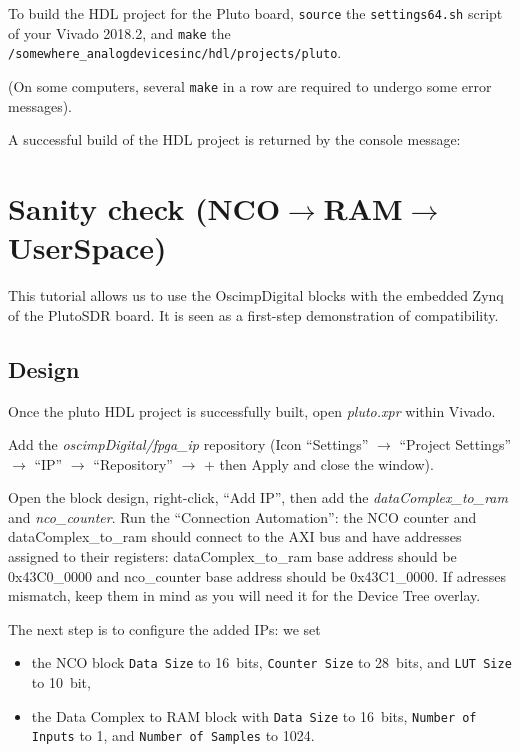 \documentclass{article}
\begin{document}
To build the HDL project for the Pluto board, {\tt source} the
{\tt settings64.sh} script of your Vivado 2018.2, and {\tt make} the
{\tt /somewhere\_analogdevicesinc/hdl/projects/pluto}.

(On some computers, several {\tt make} in a row are required to undergo some error messages). 

A successful build of the HDL project is returned by the console message:\\


\section{Sanity check (NCO$\to$RAM$\to$UserSpace)}
This tutorial allows us to use the OscimpDigital blocks with the embedded Zynq of
the PlutoSDR board. It is seen as a first-step demonstration of compatibility.

\subsection{Design}

Once the pluto HDL project is successfully built, open \emph{pluto.xpr} within
Vivado. 

Add the \emph{oscimpDigital/fpga\_ip} repository (Icon ``Settings'' $\to$ ``Project
Settings'' $\to$ ``IP'' $\to$ ``Repository'' $\to$ + then Apply and close the window).

Open the block design, right-click, ``Add IP'', then add the \emph{dataComplex\_to\_ram} 
and \emph{nco\_counter}. Run the ``Connection Automation'': the NCO counter and dataComplex\_to\_ram
should connect to the AXI bus and have addresses assigned to their registers: dataComplex\_to\_ram
base address should be 0x43C0\_0000 and nco\_counter base address should be 0x43C1\_0000. 
If adresses mismatch, keep them in mind as you will need it for the Device Tree overlay.

The next step is to configure the added IPs: %
we set
\begin{itemize}
\item the NCO block {\tt Data Size} to 16~bits, {\tt Counter Size} to 28~bits, and {\tt LUT
Size} to 10~bit,
\item the Data Complex to RAM block with {\tt Data Size} to 16~bits, {\tt Number of Inputs}
to 1, and {\tt Number of Samples} to 1024. %
\end{itemize}
\end{document}
